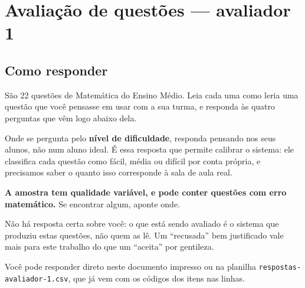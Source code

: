 \documentclass[11pt,a4paper]{article}
\begin{document}
\section*{Avaliação de questões --- avaliador 1}
\subsection*{Como responder}

São 22 questões de Matemática do Ensino Médio. Leia cada uma como leria uma
questão que você pensasse em usar com a sua turma, e responda às quatro
perguntas que vêm logo abaixo dela.

Onde se pergunta pelo \textbf{nível de dificuldade}, responda pensando nos
seus alunos, não num aluno ideal. É essa resposta que permite calibrar o
sistema: ele classifica cada questão como fácil, média ou difícil por conta
própria, e precisamos saber o quanto isso corresponde à sala de aula real.

\textbf{A amostra tem qualidade variável, e pode conter questões com erro
matemático.} Se encontrar algum, aponte onde.

Não há resposta certa sobre você: o que está sendo avaliado é o sistema que
produziu estas questões, não quem as lê. Um ``recusada'' bem justificado vale
mais para este trabalho do que um ``aceita'' por gentileza.

Você pode responder direto neste documento impresso ou na planilha
\texttt{respostas-avaliador-1.csv}, que já vem com os códigos dos itens nas linhas.
\end{document}
